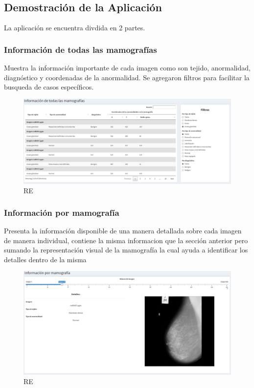 \documentclass[
]{article}
\begin{document}
\hypertarget{demostraciuxf3n-de-la-aplicaciuxf3n}{%
\subsection{Demostración de la
Aplicación}\label{demostraciuxf3n-de-la-aplicaciuxf3n}}

La aplicación se encuentra divdida en 2 partes.

\hypertarget{informaciuxf3n-de-todas-las-mamografuxedas}{%
\subsubsection{Información de todas las
mamografías}\label{informaciuxf3n-de-todas-las-mamografuxedas}}

Muestra la información importante de cada imagen como son tejido,
anormalidad, diagnóstico y coordenadas de la anormalidad. Se agregaron
filtros para facilitar la busqueda de casos específicos.

\begin{figure}
\centering
\includegraphics{img/app_1.png}
\caption{RE}
\end{figure}

\hypertarget{informaciuxf3n-por-mamografuxeda}{%
\subsubsection{Información por
mamografía}\label{informaciuxf3n-por-mamografuxeda}}

Presenta la información disponible de una manera detallada sobre cada
imagen de manera individual, contiene la misma informacion que la
sección anterior pero sumando la representación visual de la mamografía
la cual ayuda a identificar los detalles dentro de la misma

\begin{figure}
\centering
\includegraphics{img/app_2.png}
\caption{RE}
\end{figure}
\end{document}
